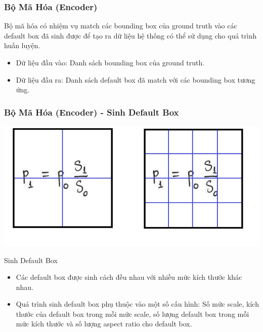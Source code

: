 \documentclass{beamer}
\begin{document}
	\begin{frame}
		\frametitle{Bộ Mã Hóa (Encoder)}
		
		Bộ mã hóa có nhiệm vụ match các bounding box của ground truth vào các default box đã sinh được để tạo ra dữ liệu hệ thống có thể sử dụng cho quá trình huấn luyện.\\
		
		\begin{itemize}
			\item Dữ liệu đầu vào: Danh sách bounding box của ground truth.
			\item Dữ liệu đầu ra: Danh sách default box đã match với các bounding box tương ứng.
		\end{itemize}
		
		
		
		
		
	\end{frame}
	
	\begin{frame}
		\frametitle{Bộ Mã Hóa (Encoder) - Sinh Default Box}
		\begin{center}
			\centering
			\includegraphics[width=0.6\linewidth]{im_3.png}
		\end{center}
		\begin{block}{Sinh Default Box}
			\begin{itemize}
				\item Các default box được sinh cách đều nhau với nhiều mức kích thước khác nhau.
				\item Quá trình sinh default box phụ thuộc vào một số cấu hình: Số mức scale, kích thước của default box trong mỗi mức scale, số lượng default box trong mỗi mức kích thước và số lượng aspect ratio cho default box.
			\end{itemize}
		\end{block}
	\end{frame}
	
\end{document}
